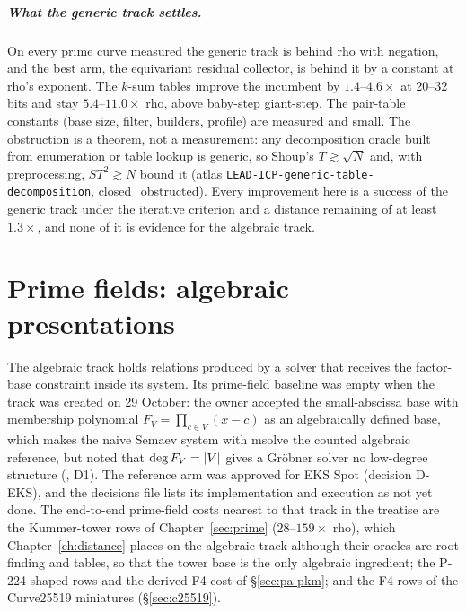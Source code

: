 \paragraph{What the generic track settles.} On every prime curve measured
the generic track is behind rho with negation, and the best arm, the
equivariant residual collector, is behind it by a constant at rho's
exponent. The $k$-sum tables improve the incumbent by $1.4$--$4.6\times$
at 20--32 bits and stay $5.4$--$11.0\times$ rho, above baby-step giant-step.
The pair-table constants (base size, filter, builders, profile) are
measured and small. The obstruction is a theorem, not a measurement: any
decomposition oracle built from enumeration or table lookup is generic, so
Shoup's $T\gtrsim\sqrt N$ and, with preprocessing, $ST^2\gtrsim N$ bound it
(atlas \texttt{LEAD-ICP-generic-table-decomposition}, closed\_obstructed).
Every improvement here is a success of the generic track under the
iterative criterion and a distance remaining of at least $1.3\times$, and
none of it is evidence for the algebraic track.

\chapter{Prime fields: algebraic presentations}\label{ch:primealgebraic}

The algebraic track holds relations produced by a solver that receives the
factor-base constraint inside its system. Its prime-field baseline was
empty when the track was created on 29 October: the owner accepted the
small-abscissa base with membership polynomial $F_V=\prod_{c\in V}(x-c)$ as
an algebraically defined base, which makes the naive Semaev system with
msolve the counted algebraic reference, but noted that $\deg F_V=\lvert V \rvert$
gives a Gr\"obner solver no low-degree structure
(, D1). The reference arm was approved for EKS Spot (decision D-EKS), and the
decisions file lists its implementation and execution as not yet done. The end-to-end prime-field costs nearest to that track in the treatise
are the Kummer-tower rows of Chapter~\ref{sec:prime} ($28$--$159\times$ rho),
which Chapter~\ref{ch:distance} places on the algebraic track although their
oracles are root finding and tables, so that the tower base is the only
algebraic ingredient; the P-224-shaped rows and the derived F4 cost of
\S\ref{sec:pa-pkm}; and the F4 rows of the Curve25519 miniatures
(\S\ref{sec:c25519}).

